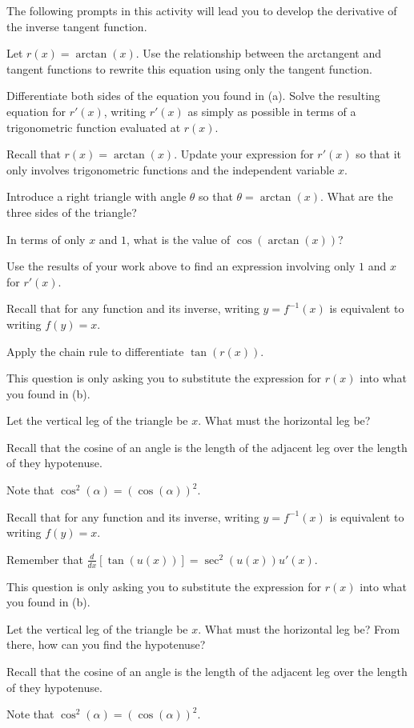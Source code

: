\begin{activity} \label{A:2.8.2}  
The following prompts in this activity will lead you to develop the derivative of the inverse tangent function.
\ba
	\item Let $r(x) = \arctan(x)$.  Use the relationship between the arctangent and tangent functions to rewrite this equation using only the tangent function.
	\item Differentiate both sides of the equation you found in (a).  Solve the resulting equation for $r'(x)$, writing $r'(x)$ as simply as possible in terms of a trigonometric function evaluated at $r(x)$.
	\item Recall that $r(x) = \arctan(x)$.  Update your expression for $r'(x)$ so that it only involves trigonometric functions and the independent variable $x$.
	\item Introduce a right triangle with angle $\theta$ so that $\theta = \arctan(x)$.  What are the three sides of the triangle?
	\item In terms of only $x$ and $1$, what is the value of $\cos(\arctan(x))$?
	\item Use the results of your work above to find an expression involving only $1$ and $x$ for $r'(x)$.
\ea
\end{activity}
\begin{smallhint}
\ba
	\item Recall that for any function and its inverse, writing $y = f^{-1}(x)$ is equivalent to writing $f(y) = x$.
	\item Apply the chain rule to differentiate $\tan(r(x))$.
	\item This question is only asking you to substitute the expression for $r(x)$ into what you found in (b).
	\item Let the vertical leg of the triangle be $x$.  What must the horizontal leg be?
	\item Recall that the cosine of an angle is the length of the adjacent leg over the length of they hypotenuse.
	\item Note that $\cos^2(\alpha) = (\cos(\alpha))^2.$
\ea
\end{smallhint}
\begin{bighint}
\ba
	\item Recall that for any function and its inverse, writing $y = f^{-1}(x)$ is equivalent to writing $f(y) = x$.
	\item Remember that $\frac{d}{dx}[\tan(u(x))] = \sec^2(u(x)) u'(x)$.
	\item This question is only asking you to substitute the expression for $r(x)$ into what you found in (b).
	\item Let the vertical leg of the triangle be $x$.  What must the horizontal leg be?  From there, how can you find the hypotenuse?
	\item Recall that the cosine of an angle is the length of the adjacent leg over the length of they hypotenuse.
	\item Note that $\cos^2(\alpha) = (\cos(\alpha))^2.$
\ea\end{bighint}

